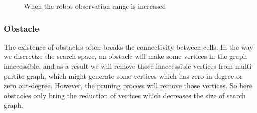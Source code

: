 \documentclass[12pt]{article}
\begin{document}
\begin{figure}[H]
  \centering 
  \caption{When the robot observation range is increased} 
  \label{fig:PMdiffRR} %
\end{figure}


\subsubsection{Obstacle}
The existence of obstacles often breaks the connectivity between cells. In the way we discretize the search space, an obstacle will make some vertices in the graph inaccessible, and as a result we will remove those inaccessible vertices from multi-partite graph, which might generate some vertices which has zero in-degree or zero out-degree. However, the pruning process will remove those vertices. So here obstacles only bring the reduction of vertices which decreases the size of search graph.
\end{document}
